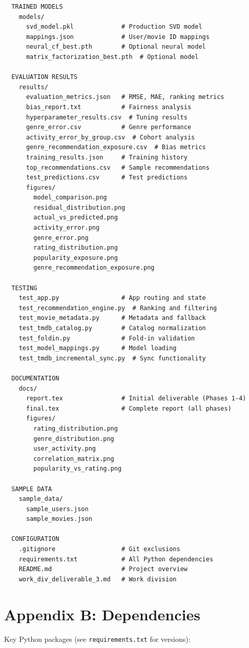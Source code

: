\documentclass[11pt,a4paper]{article}
\begin{document}
\begin{verbatim}
  TRAINED MODELS
    models/
      svd_model.pkl             # Production SVD model
      mappings.json             # User/movie ID mappings
      neural_cf_best.pth        # Optional neural model
      matrix_factorization_best.pth  # Optional model

  EVALUATION RESULTS
    results/
      evaluation_metrics.json   # RMSE, MAE, ranking metrics
      bias_report.txt           # Fairness analysis
      hyperparameter_results.csv  # Tuning results
      genre_error.csv           # Genre performance
      activity_error_by_group.csv  # Cohort analysis
      genre_recommendation_exposure.csv  # Bias metrics
      training_results.json     # Training history
      top_recommendations.csv   # Sample recommendations
      test_predictions.csv      # Test predictions
      figures/
        model_comparison.png
        residual_distribution.png
        actual_vs_predicted.png
        activity_error.png
        genre_error.png
        rating_distribution.png
        popularity_exposure.png
        genre_recommendation_exposure.png

  TESTING
    test_app.py                 # App routing and state
    test_recommendation_engine.py  # Ranking and filtering
    test_movie_metadata.py      # Metadata and fallback
    test_tmdb_catalog.py        # Catalog normalization
    test_foldin.py              # Fold-in validation
    test_model_mappings.py      # Model loading
    test_tmdb_incremental_sync.py  # Sync functionality

  DOCUMENTATION
    docs/
      report.tex                # Initial deliverable (Phases 1-4)
      final.tex                 # Complete report (all phases)
      figures/
        rating_distribution.png
        genre_distribution.png
        user_activity.png
        correlation_matrix.png
        popularity_vs_rating.png

  SAMPLE DATA
    sample_data/
      sample_users.json
      sample_movies.json

  CONFIGURATION
    .gitignore                  # Git exclusions
    requirements.txt            # All Python dependencies
    README.md                   # Project overview
    work_div_deliverable_3.md   # Work division
\end{verbatim}

\section*{Appendix B: Dependencies}

Key Python packages (see \texttt{requirements.txt} for versions):
\end{document}
